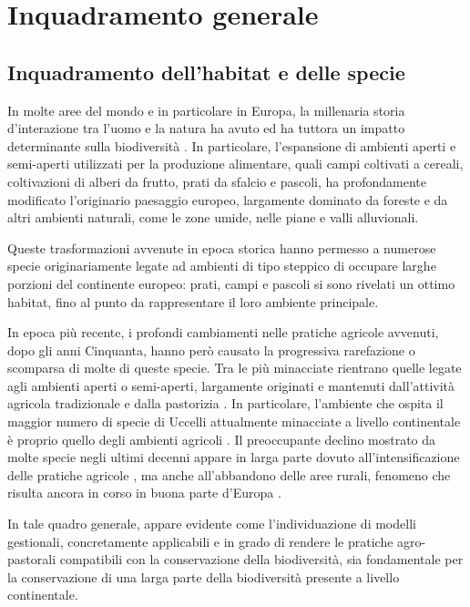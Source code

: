\documentclass[10pt,twoside,openany,x11names,svgnames,italian,a5paper,dvipsnames,table]{memoir}
\newcommand\chapterillustration{}
\begin{document}
\setlength\afterchapskip{52mm}
\normalsize
\chapter{Inquadramento generale}
\renewcommand\chapterillustration{agro.jpg}

\section{Inquadramento dell'habitat e delle specie}
In molte aree del mondo e in particolare in Europa, la millenaria storia d’interazione tra l’uomo e la natura ha avuto ed ha tuttora un impatto determinante sulla biodiversità \cite{Pain97}. In particolare, l’espansione di ambienti aperti e semi-aperti utilizzati per la produzione alimentare, quali campi coltivati a cereali, coltivazioni di alberi da frutto, prati da sfalcio e pascoli, ha profondamente modificato l'originario paesaggio europeo, largamente dominato da foreste e da altri ambienti naturali, come le zone umide, nelle piane e valli alluvionali. 

Queste trasformazioni avvenute in epoca storica hanno permesso a numerose specie originariamente legate ad ambienti di tipo steppico di occupare larghe porzioni del continente europeo: prati, campi e pascoli si sono rivelati un ottimo habitat, fino al punto da rappresentare il loro ambiente principale. 

In epoca più recente, i profondi cambiamenti nelle pratiche agricole avvenuti, dopo gli anni Cinquanta, hanno però causato la progressiva rarefazione o scomparsa di molte di queste specie. Tra le più minacciate rientrano quelle legate agli ambienti aperti o semi-aperti, largamente originati e mantenuti dall’attività agricola tradizionale e dalla pastorizia \cite{Donald01}. In particolare, l’ambiente che ospita il maggior numero di specie di Uccelli attualmente minacciate a livello continentale è proprio quello degli ambienti agricoli \cite{BirdLife08}. Il preoccupante declino mostrato da molte specie negli ultimi decenni appare in larga parte dovuto all’intensificazione delle pratiche agricole \cite{Donald01}, ma anche all’abbandono delle aree rurali, fenomeno che risulta ancora in corso in buona parte d’Europa \cite{Laiolo04} \cite{Brambilla10}.

In tale quadro generale, appare evidente come l’individuazione di modelli gestionali, concretamente applicabili e in grado di rendere le pratiche agro-pastorali compatibili con la conservazione della biodiversità, sia fondamentale per la conservazione di una larga parte della biodiversità presente a livello continentale.
\end{document}
